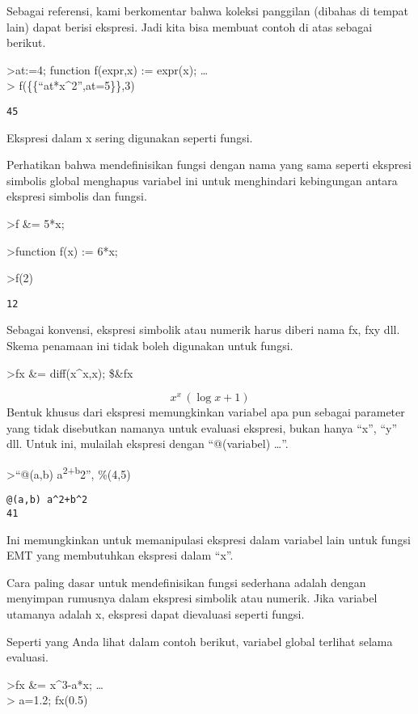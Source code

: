 \documentclass[
]{book}
\begin{document}
Sebagai referensi, kami berkomentar bahwa koleksi panggilan (dibahas di tempat lain) dapat berisi ekspresi. Jadi kita bisa membuat contoh di atas sebagai berikut.

\textgreater at:=4; function f(expr,x) := expr(x); \ldots{}\\
\textgreater{} f(\{\{``at*x\^{}2'',at=5\}\},3)

\begin{verbatim}
45
\end{verbatim}

Ekspresi dalam x sering digunakan seperti fungsi.

Perhatikan bahwa mendefinisikan fungsi dengan nama yang sama seperti ekspresi simbolis global menghapus variabel ini untuk menghindari kebingungan antara ekspresi simbolis dan fungsi.

\textgreater f \&= 5*x;

\textgreater function f(x) := 6*x;

\textgreater f(2)

\begin{verbatim}
12
\end{verbatim}

Sebagai konvensi, ekspresi simbolik atau numerik harus diberi nama fx, fxy dll. Skema penamaan ini tidak boleh digunakan untuk fungsi.

\textgreater fx \&= diff(x\^{}x,x); \$\&fx

\[x^{x}\,\left(\log x+1\right)\]Bentuk khusus dari ekspresi memungkinkan variabel apa pun sebagai parameter yang tidak disebutkan namanya untuk evaluasi ekspresi, bukan hanya ``x'', ``y'' dll. Untuk ini, mulailah ekspresi dengan ``@(variabel) \ldots{}''.

\textgreater{}``@(a,b) a\textsuperscript{2+b}2'', \%(4,5)

\begin{verbatim}
@(a,b) a^2+b^2
41
\end{verbatim}

Ini memungkinkan untuk memanipulasi ekspresi dalam variabel lain untuk fungsi EMT yang membutuhkan ekspresi dalam ``x''.

Cara paling dasar untuk mendefinisikan fungsi sederhana adalah dengan menyimpan rumusnya dalam ekspresi simbolik atau numerik. Jika variabel utamanya adalah x, ekspresi dapat dievaluasi seperti fungsi.

Seperti yang Anda lihat dalam contoh berikut, variabel global terlihat selama evaluasi.

\textgreater fx \&= x\^{}3-a*x; \ldots{}\\
\textgreater{} a=1.2; fx(0.5)
\end{document}
